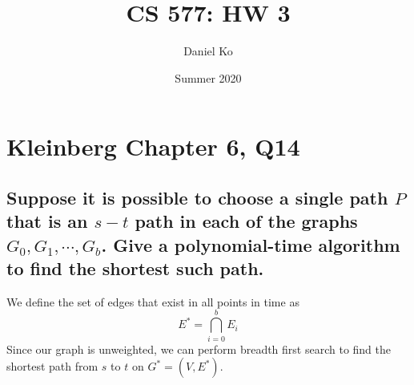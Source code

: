 \documentclass[11pt]{scrartcl}
\title{CS 577: HW 3}
\author{Daniel Ko}
\date{Summer 2020}
\newcommand{\opt}{\text{OPT}}
\begin{document}
\maketitle

\section{
  Kleinberg Chapter 6, Q14
 }

\subsection{
	Suppose it is possible to choose a single path $P$ that is an $s-t$ path in
	each of the graphs $G_0, G_1, \cdots , G_b$. Give a polynomial-time algorithm
	to find the shortest such path.
}
We define the set of edges that exist in all points in time as $$E^* = \bigcap_{i=0}^{b} E_i$$
Since our graph is unweighted, we can perform breadth first search to find the shortest path from
$s$ to $t$ on $G^* = (V, E^*)$.

\iffalse
	We define $\delta(v,t)$ to be the length of the shortest
	path from $v$ to $t$.
	$$
		\delta(v,t) =
		\begin{cases}
			1                                                   & \textbf{when } (v, t) \in E^*             \\
			\infty                                              & \textbf{when } v \text{ has been visited} \\
			\min(\{ 1 + \delta(\phi,t) \mid (v,\phi) \in E^*\}) & \textbf{otherwise}                        \\
		\end{cases}
	$$
	Similiar to (6.23) from the book, we can modify the Bellman–Ford algorithm
	to find the shortest path from $s$ to $t$ that exists in all $G_i$. We define $\opt(i,v)$ to be the length of the shortest
	path from $v$ to $t$ using at most $i$ edges.
	$$\opt(i,v) =
		\begin{cases}
			\min \bigg(\opt(i-1,v),\min\Big(\{1 + \opt(i-1,w) \mid  (v,w) \in E^*\}\Big) \bigg) & \textbf{when } i > 0 \\
			0                                                                                   & \textbf{when } v = t \\
			\infty                                                                              & \textbf{otherwise}
		\end{cases}
	$$
\fi
\end{document}
